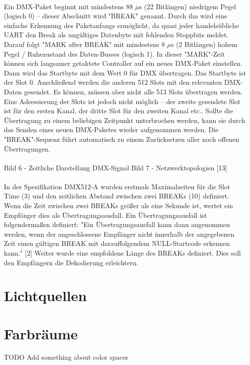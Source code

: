\documentclass[11pt]{scrartcl}
\begin{document}
\\
Ein DMX-Paket beginnt mit mindestens 88 $\mu$s (22 Bitlängen) niedrigem Pegel (logisch 0) – dieser
Abschnitt wird "BREAK" genannt. Durch ihn wird eine einfache Erkennung des Paketanfangs
ermöglicht, da quasi jeder handelsübliche UART den Break als ungültiges Datenbyte mit fehlenden
Stoppbits meldet. Darauf folgt "MARK after BREAK" mit mindestens 8 $\mu$s (2 Bitlängen) hohem Pegel /
Ruhezustand des Daten-Busses (logisch 1). In dieser "MARK"-Zeit können sich langsamer getaktete
Controller auf ein neues DMX-Paket einstellen. Dann wird das Startbyte mit dem Wert 0 für DMX
übertragen. Das Startbyte ist der Slot 0. Anschließend werden die anderen 512 Slots mit den
relevanten DMX-Daten gesendet. Es können, müssen aber nicht alle 513 Slots übertragen werden.
Eine Adressierung der Slots ist jedoch nicht möglich – der zweite gesendete Slot ist für den ersten
Kanal, der dritte Slot für den zweiten Kanal etc.. Sollte die Übertragung zu einem beliebigen
Zeitpunkt unterbrochen werden, kann sie durch das Senden eines neuen DMX-Paketes wieder
aufgenommen werden. Die "BREAK"-Sequenz führt automatisch zu einem Zurücksetzen aller noch
offenen Übertragungen.\\
\\
Bild 6 - Zeitliche Darstellung DMX-Signal
Bild 7 - Netzwerktopologien [13]\\
\\
In der Spezifikation DMX512-A wurden erstmals Maximalzeiten für die Slot Time (3) und den
zeitlichen Abstand zwischen zwei BREAKs (10) definiert. Wenn die Zeit zwischen zwei BREAKs größer
als eine Sekunde ist, wertet ein Empfänger dies als Übertragungsausfall. Ein Übertragungsausfall ist
folgendermaßen definiert: "Ein Übertragungsausfall kann dann angenommen werden, wenn der
angeschlossene Empfänger nicht innerhalb der angegebenen Zeit einen gültigen BREAK mit
darauffolgendem NULL-Startcode erkennen kann." [2] Weiter wurde eine empfohlene Länge des
BREAKs definiert. Dies soll den Empfängern die Dekodierung erleichtern.
\clearpage

\section{Lichtquellen}
\clearpage

\section{Farbräume}
TODO Add something about color spaces
\clearpage
\end{document}

